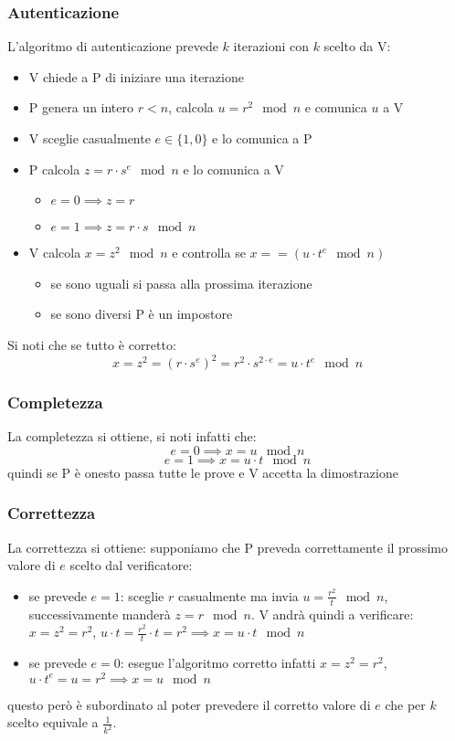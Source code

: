 \subsubsection{Autenticazione}
L'algoritmo di autenticazione prevede $k$ iterazioni con $k$ scelto da V:
\begin{itemize}
    \item V chiede a P di iniziare una iterazione
    \item P genera un intero $r < n$, calcola $u = r^2 \mod n$ e comunica $u$ a V
    \item V sceglie casualmente $e \in \{1, 0\}$ e lo comunica a P
    \item P calcola $z = r \cdot s^e \mod n$ e lo comunica a V
    \begin{itemize}
        \item $e = 0 \implies z = r$
        \item $e = 1 \implies z = r \cdot s \mod n$
    \end{itemize}
    \item V calcola $x = z^2 \mod n$ e controlla se $x == (u \cdot t^e \mod n)$
    \begin{itemize}
        \item se sono uguali si passa alla prossima iterazione
        \item se sono diversi P è un impostore
    \end{itemize}
\end{itemize}

Si noti che se tutto è corretto:
$$
    x = z^2 = (r \cdot s^e)^2 = r^2 \cdot s^{2 \cdot e} = u \cdot t^{e} \mod n
$$

\subsubsection{Completezza}
La completezza si ottiene, si noti infatti che:
$$ e = 0 \implies x = u \mod n $$
$$ e = 1 \implies x = u \cdot t \mod n $$
quindi se P è onesto passa tutte le prove e V accetta la dimostrazione

\subsubsection{Correttezza}
La correttezza si ottiene: supponiamo che P preveda correttamente il prossimo valore di $e$ scelto dal verificatore:
\begin{itemize}
    \item se prevede $e = 1$: sceglie $r$ casualmente ma invia $u = \frac{r^2}{t} \mod n$, successivamente manderà $z = r \mod n$. V andrà quindi a verificare: $x = z^2 = r^2$, $u \cdot t = \frac{r^2}{t} \cdot t = r^2 \implies x = u \cdot t \mod n$
    \item se prevede $e = 0$: esegue l'algoritmo corretto infatti $x = z^2 = r^2$, $u \cdot t^e = u = r^2 \implies x = u \mod n$
\end{itemize}
questo però è subordinato al poter prevedere il corretto valore di $e$ che per $k$ scelto equivale a $\frac{1}{k^2}$.

